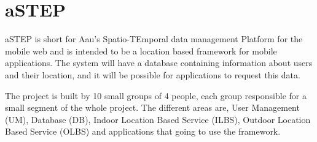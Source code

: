 \section{aSTEP}
aSTEP is short for Aau's Spatio-TEmporal data management Platform for the mobile web and is intended to be a location based framework for mobile applications. The system will have a database containing information about users and their location, and it will be possible for applications to request this data.

The project is built by 10 small groups of 4 people, each group responsible for a small segment of the whole project. The different areas are, User Management (UM), Database (DB), Indoor Location Based Service (ILBS), Outdoor Location Based Service (OLBS) and applications that going to use the framework.